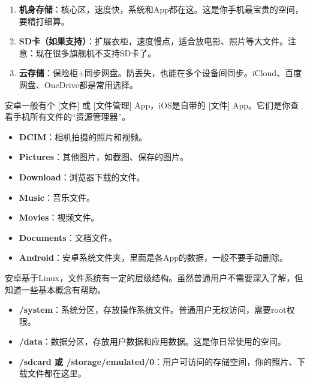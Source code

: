 


\begin{enumerate}
  \item \textbf{机身存储}：核心区，速度快，系统和App都在这。这是你手机最宝贵的空间，要精打细算。
  \item \textbf{SD卡（如果支持）}：扩展衣柜，速度慢点，适合放电影、照片等大文件。注意：现在很多旗舰机不支持SD卡了。
  \item \textbf{云存储}：保险柜+同步网盘。防丢失，也能在多个设备间同步。iCloud、百度网盘、OneDrive都是常用选择。
\end{enumerate}


安卓一般有个 [文件] 或 [文件管理] App，iOS是自带的 [文件] App。它们是你查看手机所有文件的“资源管理器”。


\begin{itemize}
  \item \textbf{DCIM}：相机拍摄的照片和视频。
  \item \textbf{Pictures}：其他图片，如截图、保存的图片。
  \item \textbf{Download}：浏览器下载的文件。
  \item \textbf{Music}：音乐文件。
  \item \textbf{Movies}：视频文件。
  \item \textbf{Documents}：文档文件。
  \item \textbf{Android}：安卓系统文件夹，里面是各App的数据，一般不要手动删除。
\end{itemize}


安卓基于Linux，文件系统有一定的层级结构。虽然普通用户不需要深入了解，但知道一些基本概念有帮助。


\begin{itemize}
  \item \textbf{/system}：系统分区，存放操作系统文件。普通用户无权访问，需要root权限。
  \item \textbf{/data}：数据分区，存放用户数据和应用数据。这是你日常使用的空间。
  \item \textbf{/sdcard 或 /storage/emulated/0}：用户可访问的存储空间，你的照片、下载文件都在这里。
\end{itemize}


